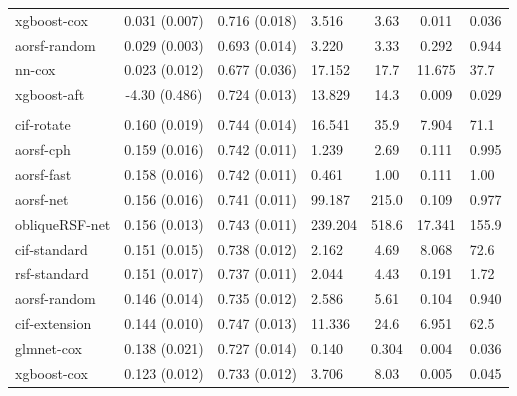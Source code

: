 \documentclass[twoside,11pt]{article}\usepackage[]{graphicx}\usepackage[]{xcolor}
\newenvironment{knitrout}{}{} %
\begin{document}
\begin{knitrout}
\begin{longtable}{lcclccl}
\hspace{1em}xgboost-cox & 0.031 (0.007) & 0.716 (0.018) & 3.516 & 3.63 & 0.011 & 0.036\\
\hspace{1em}aorsf-random & 0.029 (0.003) & 0.693 (0.014) & 3.220 & 3.33 & 0.292 & 0.944\\
\hspace{1em}nn-cox & 0.023 (0.012) & 0.677 (0.036) & 17.152 & 17.7 & 11.675 & 37.7\\
\hspace{1em}xgboost-aft & -4.30 (0.486) & 0.724 (0.013) & 13.829 & 14.3 & 0.009 & 0.029\\
\addlinespace[0.3em]
\hline
\multicolumn{7}{l}{\textit{\textbf{Monoclonal gammopathy; death, n = 1384, p = 8}}}\\
\hline
\hspace{1em}cif-rotate & 0.160 (0.019) & 0.744 (0.014) & 16.541 & 35.9 & 7.904 & 71.1\\
\hspace{1em}aorsf-cph & 0.159 (0.016) & 0.742 (0.011) & 1.239 & 2.69 & 0.111 & 0.995\\
\hspace{1em}aorsf-fast & 0.158 (0.016) & 0.742 (0.011) & 0.461 & 1.00 & 0.111 & 1.00\\
\hspace{1em}aorsf-net & 0.156 (0.016) & 0.741 (0.011) & 99.187 & 215.0 & 0.109 & 0.977\\
\hspace{1em}obliqueRSF-net & 0.156 (0.013) & 0.743 (0.011) & 239.204 & 518.6 & 17.341 & 155.9\\
\hspace{1em}cif-standard & 0.151 (0.015) & 0.738 (0.012) & 2.162 & 4.69 & 8.068 & 72.6\\
\hspace{1em}rsf-standard & 0.151 (0.017) & 0.737 (0.011) & 2.044 & 4.43 & 0.191 & 1.72\\
\hspace{1em}aorsf-random & 0.146 (0.014) & 0.735 (0.012) & 2.586 & 5.61 & 0.104 & 0.940\\
\hspace{1em}cif-extension & 0.144 (0.010) & 0.747 (0.013) & 11.336 & 24.6 & 6.951 & 62.5\\
\hspace{1em}glmnet-cox & 0.138 (0.021) & 0.727 (0.014) & 0.140 & 0.304 & 0.004 & 0.036\\
\hspace{1em}xgboost-cox & 0.123 (0.012) & 0.733 (0.012) & 3.706 & 8.03 & 0.005 & 0.045\\

\end{longtable}
\end{knitrout}
\end{document}
